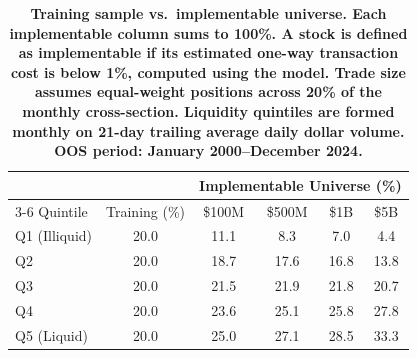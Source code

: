\begin{table}[t!]
\centering
\begin{tabular}{l c cccc}
\midrule
& & \multicolumn{4}{c}{Implementable Universe (\%)} \\
\cmidrule(lr){3-6}
Quintile & Training (\%) & \$100M & \$500M & \$1B & \$5B \\
\midrule
Q1 (Illiquid) & 20.0 & 11.1 & 8.3 & 7.0 & 4.4 \\
Q2            & 20.0 & 18.7 & 17.6 & 16.8 & 13.8 \\
Q3            & 20.0 & 21.5 & 21.9 & 21.8 & 20.7 \\
Q4            & 20.0 & 23.6 & 25.1 & 25.8 & 27.8 \\
Q5 (Liquid)   & 20.0 & 25.0 & 27.1 & 28.5 & 33.3 \\
\midrule
\end{tabular}
\caption{\footnotesize \bf Training sample vs.\ implementable universe\normalfont. Each implementable column sums to 100\%. A stock is defined as implementable if its estimated one-way transaction cost is below 1\%, computed using the \citet{frazzini2018trading} model. Trade size assumes equal-weight positions across 20\% of the monthly cross-section. Liquidity quintiles are formed monthly on 21-day trailing average daily dollar volume. OOS period: January 2000--December 2024.}
\label{tab:distribution_mismatch}
\end{table}

